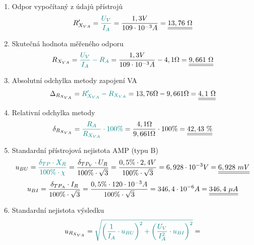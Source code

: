 \documentclass[a4paper, czech]{article}
\begin{document}
\begin{enumerate}
    \item Odpor vypočítaný z údajů přístrojů
    \begin{multline*}
        R'_{X_{VA}} = \textcolor{teal}{\frac{U_V}{I_A}} = \frac{1,3V}{109 \cdot 10^{-3}A} = \underline{\underline{13,76\ \Omega}} \hfill
    \end{multline*}
    \item Skutečná hodnota měřeného odporu
    \begin{multline*}
        R_{X_{VA}} = \textcolor{teal}{\frac{U_V}{I_A} - R_A} = \frac{1,3V}{109 \cdot 10^{-3}A} - 4,1 \Omega = \underline{\underline{9,661\ \Omega}} \hfill
    \end{multline*}
    \item Absolutní odchylka metody zapojení VA
    \begin{multline*}
        \Delta_{R_{X_{VA}}} = \textcolor{teal}{R'_{X_{VA}} - R_{X_{VA}}} = 13,76 \Omega - 9,661 \Omega = \underline{\underline{4,1\ \Omega}} \hfill
    \end{multline*}
    \item Relativní odchylka metody
    \begin{multline*}
        \delta_{R_{X_{VA}}} = \textcolor{teal}{\frac{R_A}{R_{X_{VA}}} \cdot 100\%} = \frac{4,1 \Omega}{9,661 \Omega} \cdot 100\% = \underline{\underline{42,43\ \%}} \hfill
    \end{multline*}
    \item Standardní přístrojová nejistota AMP (typu B)
    \begin{multline*}
        u_{BU} = \textcolor{teal}{\frac{\delta_{TP} \cdot X_R}{100 \% \cdot \chi}} = \frac{\delta_{TP_V} \cdot U_R}{100 \% \cdot \sqrt{3}} = \frac{0,5\% \cdot 2,4V}{100 \% \cdot \sqrt{3}} = 6,928 \cdot 10^{-3} V = \underline{\underline{6,928\ mV}} \hfill
    \end{multline*}
    \begin{multline*}
        u_{BI} = \frac{\delta_{TP_A} \cdot I_R}{100 \% \cdot \sqrt{3}} = \frac{0,5\% \cdot 120 \cdot 10^{-3}A}{100 \% \cdot \sqrt{3}} = 346,4 \cdot 10^{-6} A = \underline{\underline{346,4\ \mu A}} \hfill
    \end{multline*}
    \item Standardní nejistota výsledku
    \begin{multline*}
        u_{R_{X_{VA}}} = \textcolor{teal}{\sqrt{\left(\frac{1}{I_A} \cdot u_{BU}\right)^2 + \left(\frac{U_V}{I_A^2} \cdot u_{BI}\right)^2}} =  \hfill \\

\end{multline*}
\end{enumerate}
\end{document}

